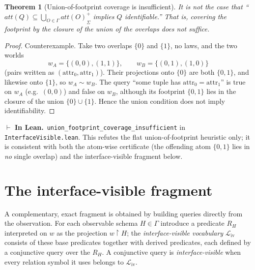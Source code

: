 \documentclass[11pt]{article}
\newcommand{\att}[1]{\mathit{att}(#1)}
\newcommand{\clo}[1]{{#1}^{+}_{\Sigma}}      %
\newcommand{\ObsFam}{\Gamma}                 %
\newcommand{\proj}[2]{#1{\restriction}#2}    %
\newcommand{\lean}[1]{\texttt{#1}}           %
\theoremstyle{plain}
\newtheorem{theorem}{Theorem}
\theoremstyle{definition}
\newcommand{\inlean}[1]{\par\smallskip\noindent%
  {\small\textcolor{blue!50!black}{$\vdash$ \textbf{In Lean.}}~#1}\par\smallskip}
\begin{document}
\begin{theorem}[Union-of-footprint coverage is insufficient]\label{thm:union-false}
It is \emph{not} the case that ``$\att Q\subseteq\clo{\bigcup_{O\in\ObsFam}\att O}$ implies
$Q$ identifiable.'' That is, covering the footprint by the closure of the \emph{union} of the
overlaps does not suffice.
\end{theorem}
\begin{proof}
Counterexample. Take two overlaps $\{0\}$ and $\{1\}$, no laws, and the two worlds
\[
  w_A=\{(0,0),(1,1)\},\qquad w_B=\{(0,1),(1,0)\}
\]
(pairs written as $(\text{attr}_0,\text{attr}_1)$). Their projections onto $\{0\}$ are both
$\{0,1\}$, and likewise onto $\{1\}$, so $w_A\sim w_B$. The query ``some tuple has
$\text{attr}_0=\text{attr}_1$'' is true on $w_A$ (e.g.\ $(0,0)$) and false on $w_B$, although
its footprint $\{0,1\}$ lies in the closure of the union $\{0\}\cup\{1\}$. Hence the union
condition does not imply identifiability.
\end{proof}
\inlean{\lean{union\_footprint\_coverage\_insufficient} in \lean{InterfaceVisible.lean}.
This refutes the flat union-of-footprint heuristic only; it is consistent with both the
atom-wise certificate (the offending atom $\{0,1\}$ lies in \emph{no} single overlap) and the
interface-visible fragment below.}

\section{The interface-visible fragment}\label{sec:iv}

A complementary, exact fragment is obtained by building queries directly from the observation.
For each observable schema $H\in\ObsFam$ introduce a predicate $R_H$ interpreted on $w$ as the
projection $\proj w H$; the \emph{interface-visible vocabulary} $\mathcal L_{\mathrm{iv}}$
consists of these base predicates together with derived predicates, each defined by a
conjunctive query over the $R_H$. A conjunctive query is \emph{interface-visible} when every
relation symbol it uses belongs to $\mathcal L_{\mathrm{iv}}$.
\end{document}
